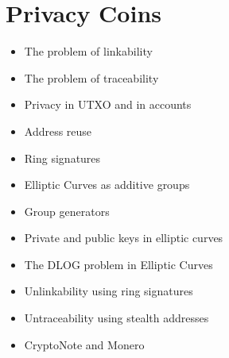 \chapter{Privacy Coins}

{\color{red}
\begin{itemize}
\item The problem of linkability
\item The problem of traceability
\item Privacy in UTXO and in accounts
\item Address reuse
\item Ring signatures
\item Elliptic Curves as additive groups
\item Group generators
\item Private and public keys in elliptic curves
\item The DLOG problem in Elliptic Curves
\item Unlinkability using ring signatures
\item Untraceability using stealth addresses
\item CryptoNote and Monero
\end{itemize}
}
